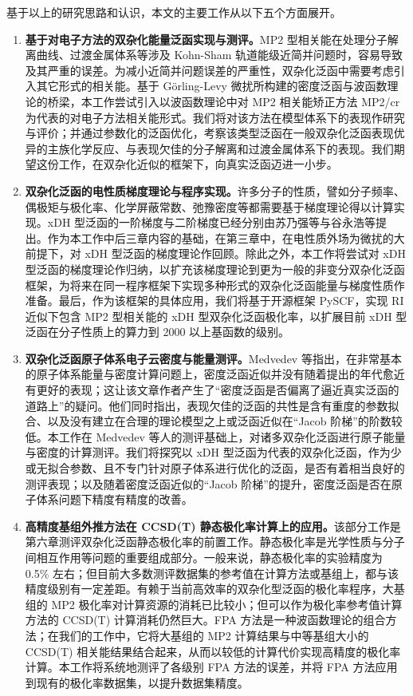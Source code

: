 基于以上的研究思路和认识，本文的主要工作从以下五个方面展开。
\begin{enumerate}[nosep]
  \item \textbf{基于对电子方法的双杂化能量泛函实现与测评。}MP2 型相关能在处理分子解离曲线、过渡金属体系等涉及 Kohn-Sham 轨道能级近简并问题时，容易导致及其严重的误差。为减小近简并问题误差的严重性，双杂化泛函中需要考虑引入其它形式的相关能。基于 G\"orling-Levy 微扰所构建的密度泛函与波函数理论的桥梁，本工作尝试引入以波函数理论中对 MP2 相关能矫正方法 MP2/cr\cite{Dykstra-Davidson.IJQC.2000} 为代表的对电子方法相关能形式。我们将对该方法在模型体系下的表现作研究与评价；并通过参数化的泛函优化，考察该类型泛函在一般双杂化泛函表现优异的主族化学反应、与表现欠佳的分子解离和过渡金属体系下的表现。我们期望这份工作，在双杂化近似的框架下，向真实泛函迈进一小步。

  \item \textbf{双杂化泛函的电性质梯度理论与程序实现。}许多分子的性质，譬如分子频率、偶极矩与极化率、化学屏蔽常数、弛豫密度等都需要基于梯度理论得以计算实现。xDH 型泛函的一阶梯度与二阶梯度已经分别由苏乃强等\cite{Su-Xu.SCC.2013}与谷永浩等\cite{Gu-Xu.JCTC.2021}提出。作为本工作中后三章内容的基础，在第三章中，在电性质外场为微扰的大前提下，对 xDH 型泛函的梯度理论作回顾。除此之外，本工作将尝试对 xDH 型泛函的梯度理论作归纳，以扩充该梯度理论到更为一般的非变分双杂化泛函框架，为将来在同一程序框架下实现多种形式的双杂化泛函能量与梯度性质作准备。最后，作为该框架的具体应用，我们将基于开源框架 PySCF\cite{Sun-Chan.WCMS.2018, Sun-Chan.JCP.2020}，实现 RI 近似下包含 MP2 型相关能的 xDH 型双杂化泛函极化率，以扩展目前 xDH 型泛函在分子性质上的算力到 2000 以上基函数的级别。
  
  \item \textbf{双杂化泛函原子体系电子云密度与能量测评。}Medvedev 等指出，在非常基本的原子体系能量与密度计算问题上，密度泛函近似并没有随着提出的年代愈近有更好的表现\cite{Medvedev-Lyssenko.S.2017}；这让该文章作者产生了“密度泛函是否偏离了逼近真实泛函的道路上”的疑问。他们同时指出，表现欠佳的泛函的共性是含有重度的参数拟合、以及没有建立在合理的理论模型之上或泛函近似在“Jacob 阶梯”的阶数较低。本工作在 Medvedev 等人的测评基础上，对诸多双杂化泛函进行原子能量与密度的计算测评。我们将探究以 xDH 型泛函为代表的双杂化泛函，作为少或无拟合参数、且不专门针对原子体系进行优化的泛函，是否有着相当良好的测评表现；以及随着密度泛函近似的“Jacob 阶梯”的提升，密度泛函是否在原子体系问题下精度有精度的改善。
  
  \item \textbf{高精度基组外推方法在 CCSD(T) 静态极化率计算上的应用。}该部分工作是第六章测评双杂化泛函静态极化率的前置工作。静态极化率是光学性质与分子间相互作用等问题的重要组成部分。一般来说，静态极化率的实验精度为 0.5\% 左右；但目前大多数测评数据集的参考值在计算方法或基组上，都与该精度级别有一定差距。有赖于当前高效率的双杂化型泛函的极化率程序，大基组的 MP2 极化率对计算资源的消耗已比较小；但可以作为极化率参考值计算方法的 CCSD(T) 计算消耗仍然巨大。FPA 方法是一种波函数理论的组合方法；在我们的工作中，它将大基组的 MP2 计算结果与中等基组大小的 CCSD(T) 相关能结果结合起来，从而以较低的计算代价实现高精度的极化率计算。本工作将系统地测评了各级别 FPA 方法的误差，并将 FPA 方法应用到现有的极化率数据集，以提升数据集精度。
  

\end{enumerate}
